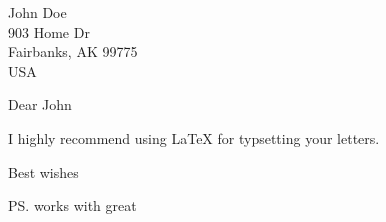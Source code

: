 \documentclass[english]{GIletter}
\begin{document}
\begin{letter}
  {John Doe \\
    903 Home Dr \\
    Fairbanks, AK 99775 \\
    USA  \\
  }
  
  \opening{Dear John}
  
  I highly recommend using \LaTeX{} for typsetting your letters. 

  \closing{Best wishes}
  
  
  \ps{works with great}
  
\end{letter}
\end{document}
